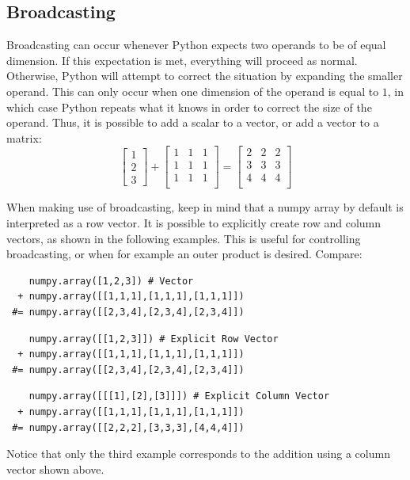 \subsection{Broadcasting}\label{broad}
  Broadcasting can occur whenever Python expects two operands to be of equal dimension. If this expectation is met, everything will proceed as normal. Otherwise, Python will attempt to correct the situation by expanding the smaller operand. This can only occur when one dimension of the operand is equal to $1$, in which case Python repeats what it knows in order to correct the size of the operand. Thus, it is possible to add a scalar to a vector, or add a vector to a matrix:
  $$\begin{bmatrix}1\\2\\3\end{bmatrix} + \begin{bmatrix}1&1&1\\1&1&1\\  1&1&1\\ \end{bmatrix} = \begin{bmatrix}2&2&2\\3&3&3\\4&4&4\\ \end{bmatrix}$$

When making use of broadcasting, keep in mind that a numpy array by default is interpreted as a row vector. It is possible to explicitly create row and column vectors, as shown in the following examples. This is useful for controlling broadcasting, or when for example an outer product is desired.
Compare:
\begin{lstlisting}
    numpy.array([1,2,3]) # Vector
  + numpy.array([[1,1,1],[1,1,1],[1,1,1]])
 #= numpy.array([[2,3,4],[2,3,4],[2,3,4]])
\end{lstlisting}
\begin{lstlisting}
    numpy.array([[1,2,3]]) # Explicit Row Vector
  + numpy.array([[1,1,1],[1,1,1],[1,1,1]])
 #= numpy.array([[2,3,4],[2,3,4],[2,3,4]])
\end{lstlisting}
\begin{lstlisting}
    numpy.array([[[1],[2],[3]]]) # Explicit Column Vector
  + numpy.array([[1,1,1],[1,1,1],[1,1,1]])
 #= numpy.array([[2,2,2],[3,3,3],[4,4,4]])
\end{lstlisting}

Notice that only the third example corresponds to the addition using a column vector shown above.

